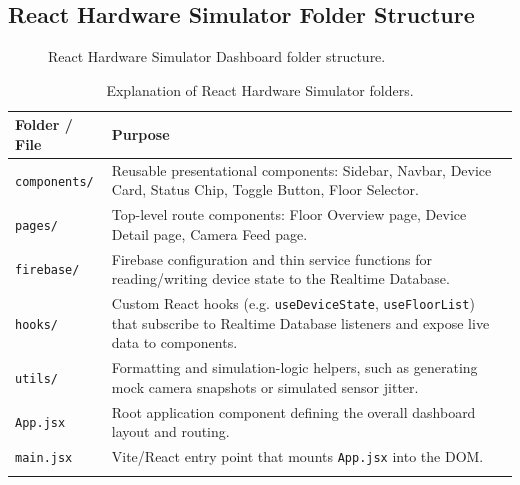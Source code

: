 \documentclass[11pt,a4paper]{article}
\begin{document}
\subsection{React Hardware Simulator Folder Structure}
\begin{figure}[H]
\centering
{}
\caption{React Hardware Simulator Dashboard folder structure.}
\label{fig:react-folders}
\end{figure}

\begin{longtable}{@{}p{3.4cm}p{10.6cm}@{}}
\toprule
\textbf{Folder / File} & \textbf{Purpose} \\
\midrule
\endhead
\texttt{components/} & Reusable presentational components: Sidebar, Navbar, Device Card, Status Chip, Toggle Button, Floor Selector. \\
\texttt{pages/} & Top-level route components: Floor Overview page, Device Detail page, Camera Feed page. \\
\texttt{firebase/} & Firebase configuration and thin service functions for reading/writing device state to the Realtime Database. \\
\texttt{hooks/} & Custom React hooks (e.g. \texttt{useDeviceState}, \texttt{useFloorList}) that subscribe to Realtime Database listeners and expose live data to components. \\
\texttt{utils/} & Formatting and simulation-logic helpers, such as generating mock camera snapshots or simulated sensor jitter. \\
\texttt{App.jsx} & Root application component defining the overall dashboard layout and routing. \\
\texttt{main.jsx} & Vite/React entry point that mounts \texttt{App.jsx} into the DOM. \\
\bottomrule
\caption{Explanation of React Hardware Simulator folders.}
\label{tab:react-folders-explained}
\end{longtable}
\end{document}
